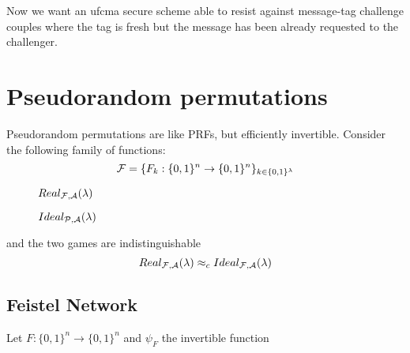 Now we want an ufcma secure scheme able to resist against message-tag challenge couples where the tag is fresh but the message has been already requested to the challenger.

\section{Pseudorandom permutations}
Pseudorandom permutations are like PRFs, but efficiently invertible.
Consider the following family of functions:
\[
    \mathcal{F}=\{ F_{k} : \{0,1\}^{n} \to \{0,1\}^{n} \}_{k \in \{0,1\}^{\lambda} }
\]

\begin{figure}[h!]
   \centering
   \sdinit{}
   \caption{$Real_{\mathcal{F}, \mathcal{A}}(\lambda)$}
\end{figure}

\begin{figure}[h!]
   \centering
   \sdinit{}
   \caption{$Ideal_{\mathcal{P}, \mathcal{A}}(\lambda)$}
\end{figure}



and the two games are indistinguishable
\[
    Real_{\mathcal{F}, \mathcal{A}}(\lambda) \approx_{c} Ideal_{\mathcal{F}, \mathcal{A}}(\lambda)
\]
\subsection{Feistel Network}
Let $F:\{0,1\}^{n} \to \{0,1\}^{n} $ and $\psi_{F}$ the invertible function

